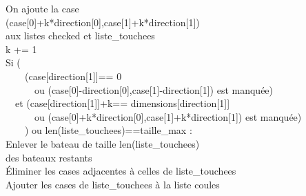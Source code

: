 {\begin{frame}[allowframebreaks]
On ajoute la case\\
 (case[0]+k*direction[0],case[1]+k*direction[1])\\
aux listes checked et liste\_touchees\\
k += 1\\
\framebreak
{}Si (\\
\ \ \ \ (case[direction[1]]== 0 \\
\ \ \ \ \ \ ou (case[0]-direction[0],case[1]-direction[1]) est manquée)\\
\ \ et (case[direction[1]]+k== dimensions[direction[1]] \\
\ \ \ \ \ \ ou (case[0]+k*direction[0],case[1]+k*direction[1]) est manquée)\\
\ \ \ \ ) ou len(liste\_touchees)==taille\_max :\\
Enlever le bateau de taille len(liste\_touchees)\\
des bateaux restants\\
Éliminer les cases adjacentes à celles de liste\_touchees\\
Ajouter les cases de liste\_touchees à la liste coules\\
\end{frame}
}



